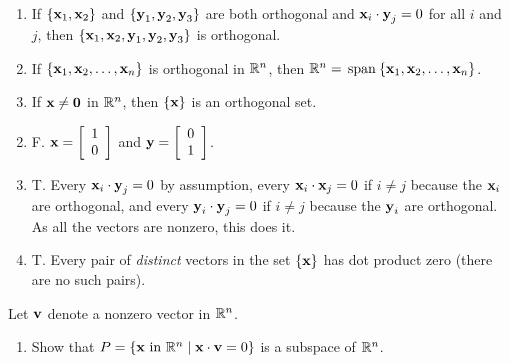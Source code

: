 \begin{multicols}{2}
\begin{ex}
\begin{enumerate}[label={\alph*.}]
\item If $\{\textbf{x}_{1}, \textbf{x}_{2}\}$ and $\{\textbf{y}_{1}, \textbf{y}_{2}, \textbf{y}_{3}\}$ are both orthogonal and $\textbf{x}_{i} \cdot \textbf{y}_{j} = 0$ for all $i$ and $j$, then $\{\textbf{x}_{1}, \textbf{x}_{2}, \textbf{y}_{1}, \textbf{y}_{2}, \textbf{y}_{3}\}$ is orthogonal.

\item If $\{\textbf{x}_{1}, \textbf{x}_{2}, \dots, \textbf{x}_{n}\}$ is orthogonal in $\mathbb{R}^n$, then $\mathbb{R}^n = \thinspace\operatorname{span\medspace}\{\textbf{x}_{1}, \textbf{x}_{2}, \dots, \textbf{x}_{n}\}$.

\item If $\textbf{x} \neq \textbf{0}$ in $\mathbb{R}^n$, then $\{\textbf{x}\}$ is an orthogonal set.

\end{enumerate}
\begin{sol}
\begin{enumerate}[label={\alph*.}]
\setcounter{enumi}{1}
\item  F. $\textbf{x} = 
\left[ \begin{array}{r}
1\\
0
\end{array} \right]$ and $\textbf{y} = 
\left[ \begin{array}{r}
0\\
1
\end{array} \right]$.

\setcounter{enumi}{3}
\item  T. Every $\textbf{x}_{i} \cdot \textbf{y}_{j} = 0$ by assumption, every $\textbf{x}_{i} \cdot \textbf{x}_{j} = 0$ if $i \neq j$ because the $\textbf{x}_{i}$ are orthogonal, and every $\textbf{y}_{i} \cdot \textbf{y}_{j} = 0$ if $i \neq j$ because the $\textbf{y}_{i}$ are orthogonal. As all the vectors are nonzero, this does it.

\setcounter{enumi}{5}
\item  T. Every pair of \textit{distinct} vectors in the set $\{\textbf{x}\}$ has dot product zero (there are no such pairs).

\end{enumerate}
\end{sol}
\end{ex}

\begin{ex}
Let $\textbf{v}$ denote a nonzero vector in $\mathbb{R}^n$.

\begin{enumerate}[label={\alph*.}]
\item Show that $P = \{\textbf{x} \mbox{ in } \mathbb{R}^n \mid \textbf{x} \cdot \textbf{v} = 0\}$ is a subspace of $\mathbb{R}^n$.


\end{enumerate}
\end{ex}
\end{multicols}
